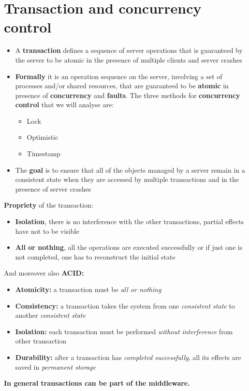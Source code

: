 \chapter{Transaction and concurrency control}
\begin{itemize}
    \item A \textbf{transaction} defines a sequence of server operations that is guaranteed by the server to be atomic in the presence of multiple clients and server crashes
    \item \textbf{Formally} it is an operation sequence on the server, involving a set of processes and/or shared resources, that are guaranteed to be \textbf{atomic} in presence of \textbf{concurrency} and \textbf{faults}. The three methods for \textbf{concurrency control} that we will analyse are:
    \begin{itemize}
        \item Lock
        \item Optimistic
        \item Timestamp
    \end{itemize}
    \item The \textbf{goal} is to ensure that all of the objects managed by a server remain in a consistent state when they are accessed by multiple transactions and in the presence of server crashes
\end{itemize}
\textbf{Propriety} of the transaction:
\begin{itemize}
    \item \textbf{Isolation}, there is no interference with the other transactions,  partial effects have not to be visible 
    \item \textbf{All or nothing}, all the operations are executed successfully or if just one is not completed, one has to reconstruct the initial state
\end{itemize}
And moreover also \textbf{ACID:}
\begin{itemize}
    \item \textbf{Atomicity:} a transaction must be \textit{all or nothing}
    \item \textbf{Consistency:} a transaction takes the system from one \textit{consistent state} to another \textit{consistent state}
    \item \textbf{Isolation:} each transaction must be performed \textit{without interference} from other transaction
    \item \textbf{Durability:} after a transaction has \textit{completed successfully}, all its effects are saved in \textit{permanent storage}
\end{itemize}
\textbf{In general transactions can be part of the middleware.}

